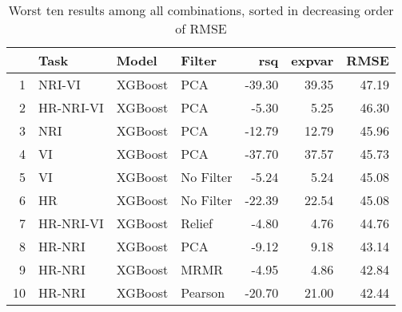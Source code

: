 \begin{table}[ht!]
\centering
\caption{Worst ten results among all combinations, sorted in decreasing order of RMSE} 
\label{tab:perf-worst-10}
\begin{tabular}{rlllrrr}
  \hline
 & Task & Model & Filter & rsq & expvar & RMSE \\ 
  \hline
1 & NRI-VI & XGBoost & PCA & -39.30 & 39.35 & 47.19 \\ 
  2 & HR-NRI-VI & XGBoost & PCA & -5.30 & 5.25 & 46.30 \\ 
  3 & NRI & XGBoost & PCA & -12.79 & 12.79 & 45.96 \\ 
  4 & VI & XGBoost & PCA & -37.70 & 37.57 & 45.73 \\ 
  5 & VI & XGBoost & No Filter & -5.24 & 5.24 & 45.08 \\ 
  6 & HR & XGBoost & No Filter & -22.39 & 22.54 & 45.08 \\ 
  7 & HR-NRI-VI & XGBoost & Relief & -4.80 & 4.76 & 44.76 \\ 
  8 & HR-NRI & XGBoost & PCA & -9.12 & 9.18 & 43.14 \\ 
  9 & HR-NRI & XGBoost & MRMR & -4.95 & 4.86 & 42.84 \\ 
  10 & HR-NRI & XGBoost & Pearson & -20.70 & 21.00 & 42.44 \\ 
   \hline
\end{tabular}
\end{table}
